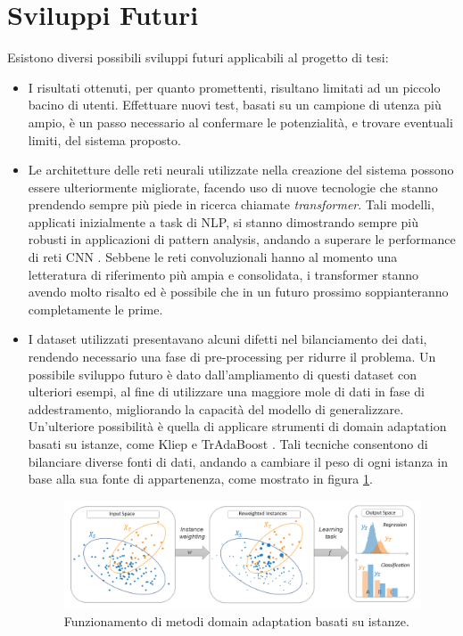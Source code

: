 \documentclass[11pt]{report}
\begin{document}
\section{Sviluppi Futuri}

Esistono diversi possibili sviluppi futuri applicabili al progetto di tesi:

\begin{itemize}
    \item I risultati ottenuti, per quanto promettenti, risultano limitati ad un piccolo bacino di utenti. Effettuare nuovi test, basati su un campione di utenza più ampio, è un passo necessario al confermare le potenzialità, e trovare eventuali limiti, del sistema proposto.
    
    \item Le architetture delle reti neurali utilizzate nella creazione del sistema possono essere ulteriormente migliorate, facendo uso di nuove tecnologie che stanno prendendo sempre più piede in ricerca chiamate \textit{transformer}. Tali modelli, applicati inizialmente a task di NLP, si stanno dimostrando sempre più robusti in applicazioni di pattern analysis, andando a superare le performance di reti CNN \cite{transformer}. Sebbene le reti convoluzionali hanno al momento una letteratura di riferimento più ampia e consolidata, i transformer stanno avendo molto risalto ed è possibile che in un futuro prossimo soppianteranno completamente le prime.
    
    
    \item I dataset utilizzati presentavano alcuni difetti nel bilanciamento dei dati, rendendo necessario una fase di pre-processing per ridurre il problema. Un possibile sviluppo futuro è dato dall'ampliamento di questi dataset con ulteriori esempi, al fine di utilizzare una maggiore mole di dati in fase di addestramento, migliorando la capacità del modello di generalizzare. Un'ulteriore possibilità è quella di applicare strumenti di domain adaptation basati su istanze, come Kliep \cite{kliep} e TrAdaBoost \cite{tradaboost}. Tali tecniche consentono di bilanciare diverse fonti di dati, andando a cambiare il peso di ogni istanza in base alla sua fonte di appartenenza, come mostrato in figura \ref{fig-instance}.
    
    
    \begin{figure}[h]
\centering
\includegraphics[scale = 0.44]{img/instance_based.png}
\caption[Funzionamento di metodi domain adaptation basati su istanze.]{Funzionamento di metodi domain adaptation basati su istanze\footnotemark.}
\label{fig-instance}
\end{figure}


\end{itemize}
\end{document}
